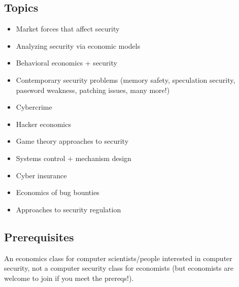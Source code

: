 \documentclass[11pt]{article}
\begin{document}
\subsection{Topics}
\begin{itemize}
    \item Market forces that affect security
    \item Analyzing security via economic models 
    \item Behavioral economics + security
    \item Contemporary security problems (memory safety, speculation security, password weakness, patching issues, many more!)
    \item Cybercrime
    \item Hacker economics
    \item Game theory approaches to security
    \item Systems control + mechanism design
    \item Cyber insurance
    \item Economics of bug bounties
    \item Approaches to security regulation
\end{itemize}

\subsection{Prerequisites}

An economics class for computer scientists/people interested in computer security, not a computer security class for economists
(but economists are welcome to join if you meet the prereqs!).
\end{document}
